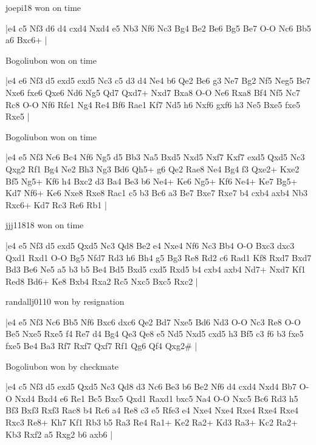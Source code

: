 \showboard

joepi18 won on time

\makegametitle
|e4 c5 Nf3 d6 d4 cxd4 Nxd4 e5 Nb3 Nf6 Nc3 Bg4 Be2 Be6 Bg5 Be7 O-O Nc6 Bb5 a6 Bxc6+  |

\showboard

Bogoliubon won on time

\makegametitle
|e4 e6 Nf3 d5 exd5 exd5 Nc3 c5 d3 d4 Ne4 b6 Qe2 Be6 g3 Ne7 Bg2 Nf5 Neg5 Be7 Nxe6 fxe6 Qxe6 Nd6 Ng5 Qd7 Qxd7+ Nxd7 Bxa8 O-O Ne6 Rxa8 Bf4 Nf5 Nc7 Rc8 O-O Nf6 Rfe1 Ng4 Re4 Bf6 Rae1 Kf7 Nd5 h6 Nxf6 gxf6 h3 Ne5 Bxe5 fxe5 Rxe5  |

\showboard

Bogoliubon won on time

\makegametitle
|e4 e5 Nf3 Nc6 Bc4 Nf6 Ng5 d5 Bb3 Na5 Bxd5 Nxd5 Nxf7 Kxf7 exd5 Qxd5 Nc3 Qxg2 Rf1 Bg4 Ne2 Bh3 Ng3 Bd6 Qh5+ g6 Qe2 Rae8 Ne4 Bg4 f3 Qxe2+ Kxe2 Bf5 Ng5+ Kf6 h4 Bxc2 d3 Ba4 Be3 b6 Ne4+ Ke6 Ng5+ Kf6 Ne4+ Ke7 Bg5+ Kd7 Nf6+ Ke6 Nxe8 Rxe8 Rac1 c5 b3 Bc6 a3 Be7 Bxe7 Rxe7 b4 cxb4 axb4 Nb3 Rxc6+ Kd7 Rc3 Re6 Rb1  |

\showboard

jjj11818 won on time

\makegametitle
|e4 e5 Nf3 d5 exd5 Qxd5 Nc3 Qd8 Be2 e4 Nxe4 Nf6 Nc3 Bb4 O-O Bxc3 dxc3 Qxd1 Rxd1 O-O Bg5 Nfd7 Rd3 h6 Bh4 g5 Bg3 Re8 Rd2 c6 Rad1 Kf8 Rxd7 Bxd7 Bd3 Be6 Ne5 a5 b3 b5 Be4 Bd5 Bxd5 cxd5 Rxd5 b4 cxb4 axb4 Nd7+ Nxd7 Kf1 Red8 Bd6+ Ke8 Bxb4 Rxa2 Rc5 Nxc5 Bxc5 Rxc2  |

\showboard

randallj0110 won by resignation

\makegametitle
|e4 e5 Nf3 Nc6 Bb5 Nf6 Bxc6 dxc6 Qe2 Bd7 Nxe5 Bd6 Nd3 O-O Nc3 Re8 O-O Be5 Nxe5 Rxe5 f4 Re7 d4 Bg4 Qe3 Qe8 e5 Nd5 Nxd5 cxd5 h3 Bf5 c3 f6 b3 fxe5 fxe5 Be4 Ba3 Rf7 Rxf7 Qxf7 Rf1 Qg6 Qf4 Qxg2\#  |

\showboard

Bogoliubon won by checkmate

\makegametitle
|e4 c5 Nf3 d5 exd5 Qxd5 Nc3 Qd8 d3 Nc6 Be3 b6 Be2 Nf6 d4 cxd4 Nxd4 Bb7 O-O Nxd4 Bxd4 e6 Re1 Bc5 Bxc5 Qxd1 Raxd1 bxc5 Na4 O-O Nxc5 Bc6 Rd3 h5 Bf3 Bxf3 Rxf3 Rac8 b4 Rc6 a4 Re8 c3 e5 Rfe3 e4 Nxe4 Nxe4 Rxe4 Rxe4 Rxe4 Rxc3 Re8+ Kh7 Kf1 Rb3 b5 Ra3 Re4 Ra1+ Ke2 Ra2+ Kd3 Ra3+ Kc2 Ra2+ Kb3 Rxf2 a5 Rxg2 b6 axb6  |

